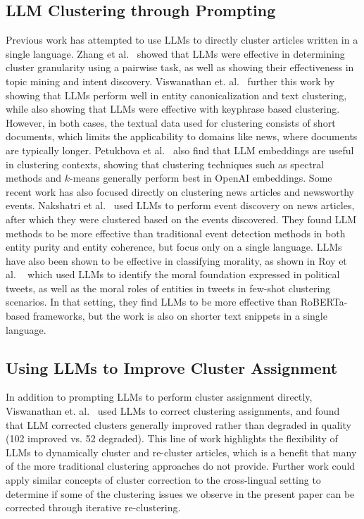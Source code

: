 \subsection{LLM Clustering through Prompting}

Previous work has attempted to use LLMs to directly cluster articles written in a single language. 
Zhang et al.~\cite{Zhang2023clusterllm} showed that LLMs were effective in determining cluster granularity using a pairwise task, as well as showing their effectiveness in topic mining and intent discovery. 
Viswanathan et. al.~\cite{Viswanathan2024} further this work by showing that LLMs perform well in entity canonicalization and text clustering, while also showing that LLMs were effective with keyphrase based clustering. 
However, in both cases, the textual data used for clustering consists of short documents, which limits the applicability to domains like news, where documents are typically longer.
Petukhova et al.~\cite{petukhova2024textclusteringllmembeddings} also find that LLM embeddings are useful in clustering contexts, showing that clustering techniques such as spectral methods and $k$-means generally perform best in OpenAI embeddings. 
Some recent work has also focused directly on clustering news articles and newsworthy events.
Nakshatri et al.~\cite{NakshatriEtal2023NewsSummaries} used LLMs to perform event discovery on news articles, after which they were clustered based on the events discovered. 
They found LLM methods to be more effective than traditional event detection methods in both entity purity and entity coherence, but focus only on a single language.
LLMs have also been shown to be effective in classifying morality, as shown in Roy et al. ~\cite{RoyEtal2022Morality} which used LLMs to identify the moral foundation expressed in political tweets, as well as the moral roles of entities in tweets in few-shot clustering scenarios.
In that setting, they find LLMs to be more effective than RoBERTa-based frameworks, but the work is also on shorter text snippets in a single language. 


\subsection{Using LLMs to Improve Cluster Assignment}

In addition to prompting LLMs to perform cluster assignment directly, Viswanathan et. al.~\cite{Viswanathan2024} used LLMs to correct clustering assignments, and found that LLM corrected clusters generally improved rather than degraded in quality (102 improved vs. 52 degraded).
This line of work highlights the flexibility of LLMs to dynamically cluster and re-cluster articles, which is a benefit that many of the more traditional clustering approaches do not provide.
Further work could apply similar concepts of cluster correction to the cross-lingual setting to determine if some of the clustering issues we observe in the present paper can be corrected through iterative re-clustering.

